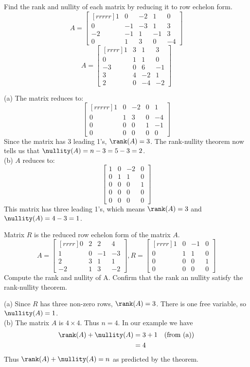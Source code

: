 \ii Find the rank and nullity of each matrix by reducing it to row echelon form.
\bb
\ii
$$A =
\begin{bmatrix}[rrrrr]
1&0&-2&1&0\\
0&-1&-3&1&3\\
-2&-1&1&-1&3\\
0&1&3&0&-4
\end{bmatrix}
$$
\ii
$$A =
\begin{bmatrix}[rrrr]
1&3&1&3\\
0&1&1&0\\
-3&0&6&-1\\
3&4&-2&1\\
2&0&-4&-2
\end{bmatrix}
$$
\ee
\begin{solution}
\noindent (a) The matrix reduces to:
$$
\begin{bmatrix}[rrrrr]
1&0&-2&0&1\\
0&1&3&0&-4\\
0&0&0&1&-1\\
0&0&0&0&0
\end{bmatrix}
$$
Since the matrix has 3 leading 1's, $\rank(A)=3$. The rank-nullity theorem now tells us that $\nullity(A)=n-3=5-3=2$. 
\\
(b) 
$A$ reduces to:
$$
\begin{bmatrix}
1&0&-2&0\\
0&1&1&0\\
0&0&0&1\\
0&0&0&0\\
0&0&0&0
\end{bmatrix}
$$
This matrix has three leading 1's, which means $\rank(A)=3$ and $\nullity(A)=4-3=1$.
\end{solution} 
\ii Matrix $R$ is the reduced row echelon form of the matrix $A$.
$$
A=
\begin{bmatrix}[rrrr]
0&2&2&4\\
1&0&-1&-3\\
2&3&1&1\\
-2&1&3&-2
\end{bmatrix},
R = 
\begin{bmatrix}[rrrr]
1&0&-1&0\\
0&1&1&0\\
0&0&0&1\\
0&0&0&0
\end{bmatrix}
$$
\bb
\ii Compute the rank and nullity of A.
\ii Confirm that the rank an nullity satisfy the rank-nullity theorem.
\ee
\begin{solution}
\noindent 
(a) Since $R$ has three non-zero rows, $\rank(A) = 3$. There is one free variable, so $\nullity(A) = 1$.
\\
(b)
The matrix $A$ is $4\times 4$. Thus $n = 4$. In our example we have 
\begin{align*}
\rank(A) + \nullity(A) &=3+1 &\text{(from (a))}\\
&=4
\end{align*}
Thus $\rank(A) + \nullity(A)=n$ as predicted by the theorem. 
\end{solution}
